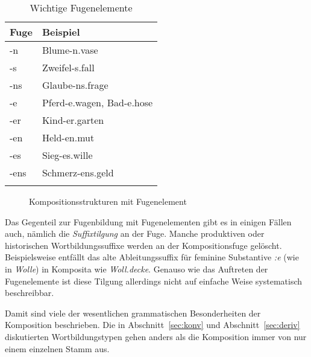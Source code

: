 \begin{table}[!htbp]
  \centering
  \begin{tabular}{ll}
    \lsptoprule
    \textbf{Fuge} & \textbf{Beispiel} \\
    \midrule
    -n & Blume-n.vase \\
    -s & Zweifel-s.fall \\
    -ns & Glaube-ns.frage \\
    -e & Pferd-e.wagen, Bad-e.hose \\
    -er & Kind-er.garten \\
    -en & Held-en.mut \\
    -es & Sieg-es.wille \\
    -ens & Schmerz-ens.geld \\
    \lspbottomrule
  \end{tabular}
  \caption{Wichtige Fugenelemente}
  \label{tab:fugen}
\end{table}

\begin{figure}[!htbp]
  \centering
  \caption{Kompositionsstrukturen mit Fugenelement}
  \label{fig:kompfugstruk}
\end{figure}

Das Gegenteil zur Fugenbildung mit Fugenelementen gibt es in einigen Fällen auch, nämlich die \textit{Suffixtilgung} an der Fuge.
Manche produktiven oder historischen Wortbildungssuffixe werden an der Kompositionsfuge gelöscht.
Beispielsweise entfällt das alte Ableitungssuffix für feminine Substantive \textit{:e} (wie in \textit{Wolle}) in Komposita wie \textit{Woll.decke}.
Genauso wie das Auftreten der Fugenelemente ist diese Tilgung allerdings nicht auf einfache Weise systematisch beschreibbar.

Damit sind viele der wesentlichen grammatischen Besonderheiten der Komposition beschrieben.
Die in Abschnitt~\ref{sec:konv} und Abschnitt~\ref{sec:deriv} diskutierten Wortbildungstypen gehen anders als die Komposition immer von nur einem einzelnen Stamm aus.




